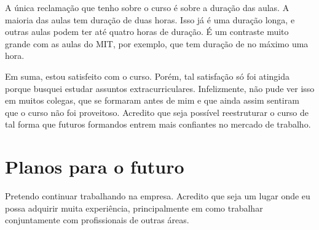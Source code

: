A única reclamação que tenho sobre o curso é sobre a duração das aulas. A maioria das aulas tem duração de duas horas. 
Isso já é uma duração longa, e outras aulas podem ter até quatro horas de duração. É um contraste muito grande com as aulas do MIT, 
por exemplo, que tem duração de no máximo uma hora.

Em suma, estou satisfeito com o curso. Porém, tal satisfação só foi atingida porque busquei estudar assuntos extracurriculares. 
Infelizmente, não pude ver isso em muitos colegas, que se formaram antes de mim e que ainda assim sentiram que o curso não foi proveitoso. 
Acredito que seja possível reestruturar o curso de tal forma que futuros formandos entrem mais confiantes no mercado de trabalho.


\section{Planos para o futuro}

Pretendo continuar trabalhando na empresa. Acredito que seja um lugar onde eu possa adquirir muita experiência,
principalmente em como trabalhar conjuntamente com profissionais de outras áreas.
